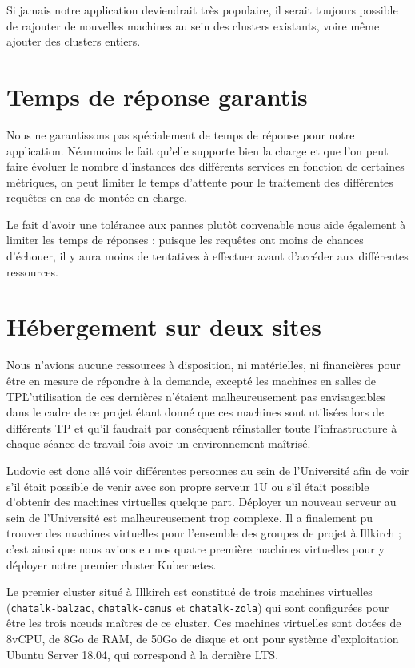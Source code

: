 Si jamais notre application deviendrait très populaire, il serait
toujours possible de rajouter de nouvelles machines au sein des clusters
existants, voire même ajouter des clusters entiers.

\section{Temps de réponse garantis}

Nous ne garantissons pas spécialement de temps de réponse pour notre
application. Néanmoins le fait qu'elle supporte bien la charge et que
l'on peut faire évoluer le nombre d'instances des différents services en
fonction de certaines métriques, on peut limiter le temps d'attente pour
le traitement des différentes requêtes en cas de montée en charge.

Le fait d'avoir une tolérance aux pannes plutôt convenable nous aide
également à limiter les temps de réponses : puisque les requêtes ont
moins de chances d'échouer, il y aura moins de tentatives à effectuer
avant d'accéder aux différentes ressources.

\section{Hébergement sur deux sites}

Nous n'avions aucune ressources à disposition, ni matérielles, ni
financières pour être en mesure de répondre à la demande, excepté les
machines en salles de TP\.
L'utilisation de ces dernières n'étaient malheureusement pas envisageables
dans le cadre de ce projet étant donné que ces machines sont utilisées lors
de différents TP et qu'il faudrait par conséquent réinstaller toute
l'infrastructure à chaque séance de travail fois avoir un environnement maîtrisé.

Ludovic est donc allé voir différentes personnes au sein de l'Université
afin de voir s'il était possible de venir avec son propre serveur 1U ou
s'il était possible d'obtenir des machines virtuelles quelque part.
Déployer un nouveau serveur au sein de l'Université est malheureusement
trop complexe. Il a finalement pu trouver des machines virtuelles pour
l'ensemble des groupes de projet à Illkirch ; c'est ainsi que nous
avions eu nos quatre première machines virtuelles pour y déployer notre
premier cluster Kubernetes.

Le premier cluster situé à Illkirch est constitué de trois machines
virtuelles (\texttt{chatalk-balzac}, \texttt{chatalk-camus} et
\texttt{chatalk-zola}) qui sont configurées pour être les trois nœuds
maîtres de ce cluster. Ces machines virtuelles sont dotées de 8vCPU,
de 8Go de RAM, de 50Go de disque et ont pour système d'exploitation
Ubuntu Server 18.04, qui correspond à la dernière LTS.


